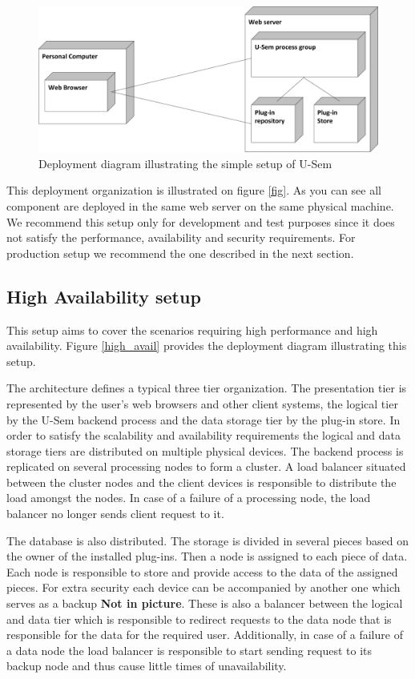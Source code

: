 \begin{figure}[h!]
  \centering
  	\includegraphics[scale=0.70]{plug-in/layers/simple_setup.png}
  \caption{Deployment diagram illustrating the simple setup of U-Sem}
  \label{simple_set}
\end{figure}

This deployment organization is illustrated on figure \ref{fig}. As you can see all component are deployed in the same web server on the same physical machine. We recommend this setup only for development and test purposes since it does not satisfy the performance, availability and security requirements. For production setup we recommend the one described in the next section.

\subsection{High Availability setup} 

This setup aims to cover the scenarios requiring high performance and high availability. Figure \ref{high_avail} provides the deployment diagram illustrating this setup.

The architecture defines a typical three tier organization. The presentation tier is represented by the user's web browsers and other client systems, the logical tier by the U-Sem backend process and the data storage tier by the plug-in store. In order to satisfy the scalability and availability requirements the logical and data storage tiers are distributed on multiple physical
devices. The backend process is replicated on several processing nodes to form a cluster. A load balancer situated between the cluster nodes and the client devices is responsible to distribute the load amongst the nodes. In case of a failure of a processing node, the load balancer no longer sends client request to it.

The database is also distributed. The storage is divided in several pieces based on the owner of the installed plug-ins. Then a node is assigned to each piece of data. Each node is responsible to store and provide access to the data of the assigned pieces. For extra security each device can be accompanied by another one which serves as a backup \textbf{Not in picture}. These is also a balancer between the logical and data tier which is responsible to redirect requests to the data node that is responsible for the data for the required user. Additionally, in case of a failure of a data node the load balancer is responsible to start sending request to its backup node and thus cause little times of unavailability.

